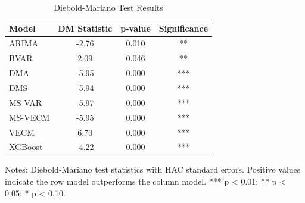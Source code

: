 \begin{table}[htbp]
\centering
\small
\caption{Diebold-Mariano Test Results}
\label{tab:dm_tests}
\begin{tabular}{lccc}
\toprule
Model & DM Statistic & p-value & Significance \\
\midrule
ARIMA & -2.76 & 0.010 & ** \\
BVAR & 2.09 & 0.046 & ** \\
DMA & -5.95 & 0.000 & *** \\
DMS & -5.94 & 0.000 & *** \\
MS-VAR & -5.97 & 0.000 & *** \\
MS-VECM & -5.95 & 0.000 & *** \\
VECM & 6.70 & 0.000 & *** \\
XGBoost & -4.22 & 0.000 & *** \\
\bottomrule
\end{tabular}
\begin{tablenotes}
\small
\item Notes: Diebold-Mariano test statistics with HAC standard errors. 
Positive values indicate the row model outperforms the column model. 
*** p < 0.01; ** p < 0.05; * p < 0.10.
\end{tablenotes}
\end{table}